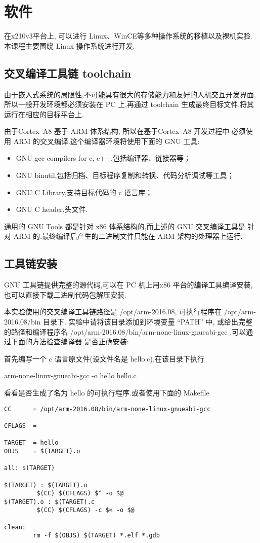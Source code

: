 \section{软件}

	在x210v3平台上, 可以进行 Linux、WinCE等多种操作系统的移植以及裸机实验.
本课程主要围绕 Linux 操作系统进行开发.

\subsection{交叉编译工具链 toolchain}
	由于嵌入式系统的局限性,不可能具有很大的存储能力和友好的人机交互开发界面,
所以一般开发环境都必须安装在 PC 上,再通过 toolchain 生成最终目标文件,将其
运行在相应的目标平台上.

	由于Cortex--A8 基于 ARM 体系结构, 所以在基于Cortex--A8 开发过程中
必须使用 ARM 的交叉编译.这个编译器环境将使用下面的 GNU 工具:
\begin{itemize}\itemsep=-3pt
  \item GNU gcc compilers for c, c++,包括编译器、链接器等；
  \item GNU binutil,包括归档、目标程序复制和转换、代码分析调试等工具；
  \item GNU C Library,支持目标代码的 c 语言库；
  \item GNU C header,头文件.
\end{itemize}
	通用的 GNU Tools 都是针对 x86 体系结构的,而上述的 GNU 交叉编译工具是
针对 ARM 的.最终编译后产生的二进制文件只能在 ARM 架构的处理器上运行.

\subsection{工具链安装}
	GNU 工具链提供完整的源代码,可以在 PC 机上用x86 平台的编译工具编译安装,
也可以直接下载二进制代码包解压安装.

	本实验使用的交叉编译工具链路径是 /opt/arm-2016.08, 可执行程序在
 /opt/arm-2016.08/bin 目录下. 实验中请将该目录添加到环境变量 ``PATH''
中, 或给出完整的路径和编译程序名
/opt/arm-2016.08/bin/arm-none-linux-gnueabi-gcc .可以通过下面的方法检查编译器
是否正确安装:

    首先编写一个 c 语言原文件(设文件名是 hello.c),在该目录下执行

    arm-none-linux-gnueabi-gcc -o hello hello.c

    看看是否生成了名为 hello 的可执行程序.或者使用下面的 Makefile

\begin{boxedminipage}{.9\textwidth}
\lstset{language=make}
\begin{lstlisting}
CC      = /opt/arm-2016.08/bin/arm-none-linux-gnueabi-gcc

CFLAGS  =

TARGET  = hello
OBJS    = $(TARGET).o

all: $(TARGET)

$(TARGET) : $(TARGET).o
         $(CC) $(CFLAGS) $^ -o $@
$(TARGET).o : $(TARGET).c
         $(CC) $(CFLAGS) -c $< -o $@

clean:
        rm -f $(OBJS) $(TARGET) *.elf *.gdb
\end{lstlisting}
\end{boxedminipage}



